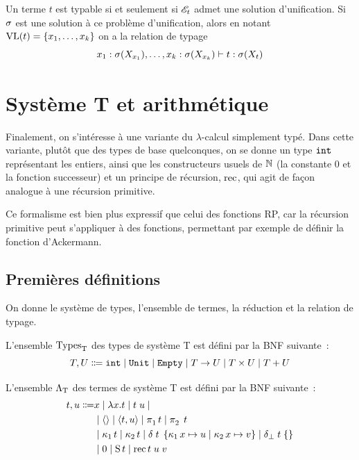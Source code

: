 \begin{theorem}
  Un terme $t$ est typable si et seulement si $\mathscr{E}_t$ admet une solution
  d'unification. Si $\sigma$ est une solution à ce problème d'unification,
  alors en notant $\operatorname{VL}(t) = \{x_1,\ldots,x_k\}$ on a la relation de typage
  \[x_1 : \sigma(X_{x_1}),\ldots, x_k : \sigma(X_{x_k})\mathrel{\vdash}
  t : \sigma(X_t)\]
\end{theorem}

\section{Système T et arithmétique}\label{sec.systemT}

Finalement, on s'intéresse à une variante du $\lambda$-calcul simplement typé.
Dans cette variante, plutôt que des types de base quelconques, on se donne un
type ${\normalfont\texttt{int}}$ représentant les entiers, ainsi que les constructeurs usuels de
$\mathbb N$ (la constante $0$ et la fonction successeur) et un principe de
récursion, $\operatorname{rec}$, qui agit de façon analogue à une récursion primitive.

Ce formalisme est bien plus expressif que celui des fonctions RP, car la
récursion primitive peut s'appliquer à des fonctions, permettant par exemple de
définir la fonction d'Ackermann.

\subsection{Premières définitions}

On donne le système de types, l'ensemble de termes, la réduction et la relation
de typage.

\begin{definition}
  L'ensemble $\tyST$ des types de système T est défini par la BNF suivante~:
  \[\varTypA,\varTypB \inddefeq
  \intT\mid\unitT\mid\emptyT\mid \varTypA\to \varTypB\mid \varTypA\times \varTypB\mid
  \varTypA+\varTypB\]
  \index[notation]{$\tyST$}
\end{definition}

\begin{definition}
  L'ensemble $\STSet$ des termes de système T est défini par la BNF suivante~:
  \begin{align*}
    t,u \inddefeq& x\mid \lambda x.t\mid t\;u\mid\\
    &\mid \langle \rangle\mid \langle t,u\rangle \mid
    \projP{1}{}t\mid\projP{2}{}\;t\\
    &\mid \coprojP{1}t\mid\coprojP{2}t\mid\deltaSTLC t x u x v\mid
    \dBSTLC{t}\\
    & \mid 0 \mid \Ss t \mid \rec t\;u\;v
  \end{align*}
  \index[notation]{$\STSet$}
\end{definition}

